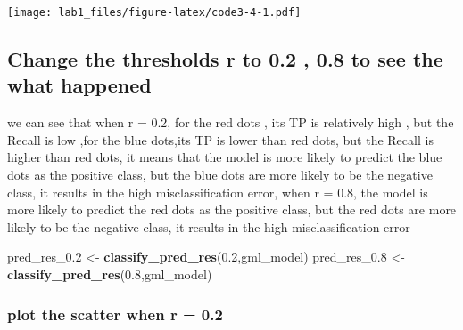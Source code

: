 \documentclass[
]{article}
\newenvironment{Shaded}{\begin{snugshade}}{\end{snugshade}}
\newcommand{\FloatTok}[1]{\textcolor[rgb]{0.00,0.00,0.81}{#1}}
\newcommand{\FunctionTok}[1]{\textcolor[rgb]{0.13,0.29,0.53}{\textbf{#1}}}
\newcommand{\NormalTok}[1]{#1}
\newcommand{\OtherTok}[1]{\textcolor[rgb]{0.56,0.35,0.01}{#1}}
\begin{document}
\texttt{[image: lab1\_files/figure-latex/code3-4-1.pdf]}

\subsection{Change the thresholds r to 0.2 , 0.8 to see the what
happened}\label{change-the-thresholds-r-to-0.2-0.8-to-see-the-what-happened}

we can see that when r = 0.2, for the red dots , its TP is relatively
high , but the Recall is low ,for the blue dots,its TP is lower than red
dots, but the Recall is higher than red dots, it means that the model is
more likely to predict the blue dots as the positive class, but the blue
dots are more likely to be the negative class, it results in the high
misclassification error, when r = 0.8, the model is more likely to
predict the red dots as the positive class, but the red dots are more
likely to be the negative class, it results in the high
misclassification error

\begin{Shaded}
\begin{Highlighting}[]
\NormalTok{pred\_res\_0}\FloatTok{.2} \OtherTok{\textless{}{-}} \FunctionTok{classify\_pred\_res}\NormalTok{(}\FloatTok{0.2}\NormalTok{,gml\_model)}
\NormalTok{pred\_res\_0}\FloatTok{.8} \OtherTok{\textless{}{-}} \FunctionTok{classify\_pred\_res}\NormalTok{(}\FloatTok{0.8}\NormalTok{,gml\_model)}
\end{Highlighting}
\end{Shaded}

\subsubsection{plot the scatter when r =
0.2}\label{plot-the-scatter-when-r-0.2}
\end{document}
